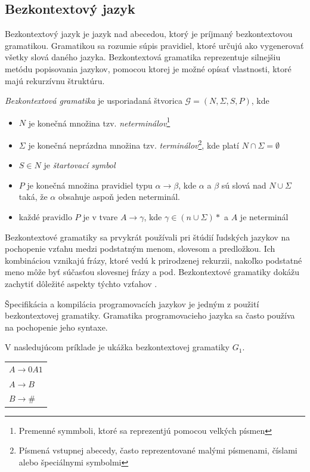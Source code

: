 \subsection{Bezkontextový jazyk}\label{CFG}
Bezkontextový jazyk je jazyk nad abecedou, ktorý je príjmaný bezkontextovou gramatikou. Gramatikou sa rozumie súpis pravidiel, ktoré určujú ako vygenerovať všetky slová daného jazyka. Bezkontextová gramatika reprezentuje silnejšiu metódu popisovania jazykov, pomocou ktorej je možné opísať vlastnosti, ktoré majú rekurzívnu štruktúru.

\begin{definice}
\textit{Bezkontextová gramatika} je usporiadaná štvorica $\mathcal{G} = (N, \Sigma , S, P)$, kde
\begin{itemize}
\item $N$ je konečná množina tzv. \textit{neterminálov}\footnote{Premenné symmboli, ktoré sa reprezentjú pomocou velkých písmen}
\item $\Sigma$ je konečná neprázdna množina tzv. \textit{terminálov}\footnote{Písmená vstupnej abecedy, často reprezentované malými písmenami, číslami alebo špeciálnymi symbolmi}, kde platí $N \cap \Sigma = \emptyset$
\item $S \in N$ je \textit{štartovací symbol}
\item $P$ je konečná množina pravidiel typu $\alpha \rightarrow \beta$, kde $\alpha$ a $\beta$ sú slová nad $N \cup \Sigma$ taká, že $\alpha$ obsahuje aspoň jeden neterminál. 
\item každé pravidlo $P$ je v tvare $A \rightarrow \gamma$, kde $\gamma \in (n \cup \Sigma)*$ a $A$ je neterminál \cite{demlova:gramatiky}
\end{itemize}
\end{definice}

Bezkontextové gramatiky sa prvykrát používali pri štúdií ľudských jazykov na pochopenie vzťahu medzi podstatným menom, slovesom a predložkou. Ich kombináciou vznikajú frázy, ktoré vedú k prirodzenej rekurzii, nakoľko podstatné meno môže byť súčasťou slovesnej frázy a pod. Bezkontextové gramatiky dokážu zachytiť dôležité aspekty týchto vzťahov \cite{computation_theory}.

Špecifikácia a kompilácia programovacích jazykov je jedným z použití bezkontextovej gramatiky. Gramatika programovacieho jazyka sa často používa na pochopenie jeho syntaxe.

V nasledujúcom príklade je ukážka bezkontextovej gramatiky $G_1$.
\begin{center}
\begin{tabular}{p{}}
$A \rightarrow 0A1$\\
$A \rightarrow B$\\
$B \rightarrow $\#
\end{tabular}
\end{center}

